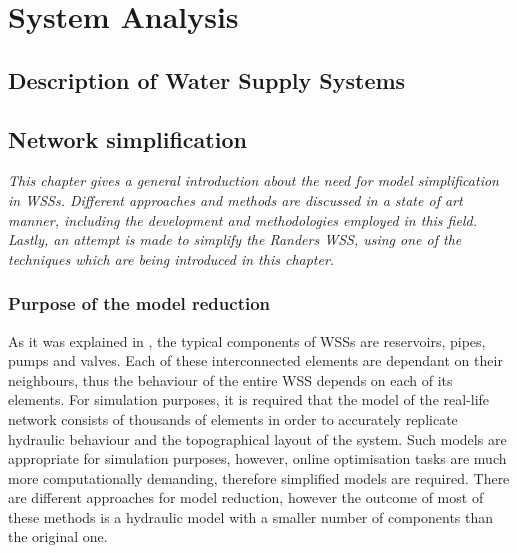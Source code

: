 
\part{System Analysis}
\label{system_analysis}

\chapter{Description of Water Supply Systems}
\label{description_of_water_supply_systems}

 





\chapter{Network simplification}
\label{network_simplification}

\emph{This chapter gives a general introduction about the need for model simplification in WSSs. Different approaches and methods are discussed in a state of art manner, including the development and methodologies employed in this field. Lastly, an attempt is made to simplify the Randers WSS, using one of the techniques which are being introduced in this chapter. }

\section{Purpose of the model reduction}
\label{purpose_of_the_model_reduction}

As it was explained in , the typical components of WSSs are reservoirs, pipes, pumps and valves. Each of these interconnected elements are dependant on their neighbours, thus the behaviour of the entire WSS depends on each of its elements. For simulation purposes, it is required that the model of the real-life network consists of thousands of elements in order to accurately replicate hydraulic behaviour and the topographical layout of the system. Such models are appropriate for simulation purposes, however, online optimisation tasks are much more computationally demanding, therefore simplified models are required. There are different approaches for model reduction, however the outcome of most of these methods is a hydraulic model with a smaller number of components than the original one. 

